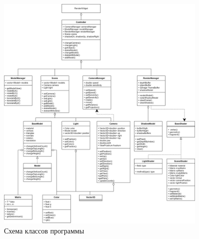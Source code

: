 \begin{figure}[h]
	\centering
	\includegraphics[width=0.9\textwidth]{img/algorithms/struct.png}
	\caption{Схема классов программы}
	\label{fig:struct}
\end{figure}

